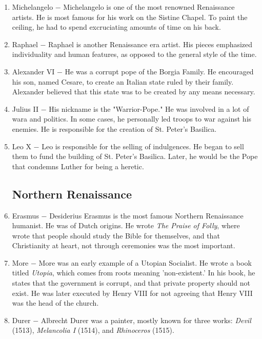\documentclass[12pt]{article}
\begin{document}
\begin{enumerate}
\item Michelangelo $-$ Michelangelo is one of the most renowned Renaissance artists. He is most famous for his work on the Sistine Chapel. To paint the ceiling, he had to spend excruciating amounts of time on his back.

\item Raphael $-$ Raphael is another Renaissance era artist. His pieces emphasized individuality and human features, as opposed to the general style of the time.

\item Alexander VI $-$ He was a corrupt pope of the Borgia Family. He encouraged his son, named Cesare, to create an Italian state ruled by their family. Alexander believed that this state was to be created by any means necessary.

\item Julius II $-$ His nickname is the "Warrior-Pope." He was involved in a lot of wara and politics. In some cases, he personally led troops to war against his enemies. He is responsible for the creation of St. Peter's Basilica.

\item Leo X $-$ Leo is responsible for the selling of indulgences. He began to sell them to fund the building of St. Peter's Basilica. Later, he would be the Pope that condemns Luther for being a heretic.

\subsection{Northern Renaissance}

\item Erasmus $-$ Desiderius Erasmus is the most famous Northern Renaissance humanist. He was of Dutch origins. He wrote \textit{The Praise of Folly}, where wrote that people should study the Bible for themselves, and that Christianity at heart, not through ceremonies was the most important.

\item More $-$ More was an early example of a Utopian Socialist. He wrote a book titled \textit{Utopia}, which comes from roots meaning 'non-existent.' In his book, he states that the government is corrupt, and that private property should not exist. He was later executed by Henry VIII for not agreeing that Henry VIII was the head of the church.

\item Durer $-$ Albrecht Durer was a painter, mostly known for three works: \textit{Devil} (1513), \textit{Melancolia I} (1514), and \textit{Rhinoceros} (1515).


\end{enumerate}
\end{document}
